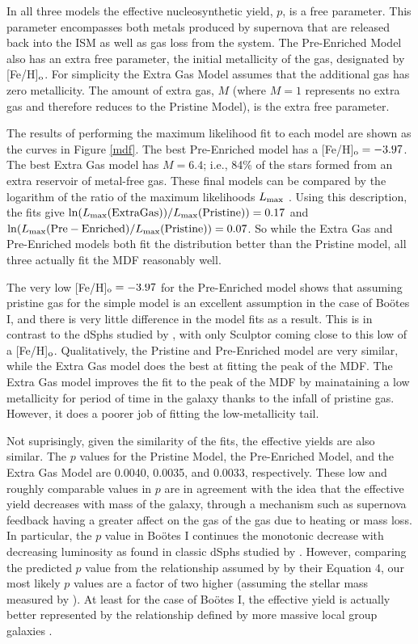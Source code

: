 \documentclass[iop]{emulateapj}
\def\bootes{Bo\"{o}tes I}
\begin{document}
In all three models the effective nucleosynthetic yield, $p$, is a
free parameter. This parameter encompasses both metals produced by
supernova that are released back into the ISM as well as gas loss from the
system. The Pre-Enriched Model also has an extra free parameter, the
initial metallicity of the gas, designated by [Fe/H]$_{\rm o}$. For
simplicity the Extra Gas Model assumes that the additional gas has
zero metallicity. The amount of extra gas, $M$ (where $M=1$ represents
no extra gas and therefore reduces to the Pristine Model), is the
extra free parameter.

The results of performing the maximum likelihood fit to each model are
shown as the curves in Figure \ref{mdf}. The best Pre-Enriched model
has a [Fe/H]$_{\rm o}=-3.97$. The best Extra Gas model has $M=6.4$;
i.e., 84\% of the stars formed from an extra reservoir of metal-free
gas. These final models can be compared by the logarithm of the ratio
of the maximum likelihoods $L_{\rm max}$ \citep{kirby11a}. Using this
description, the fits give ${\rm ln} (L_{\rm max}({\rm{Extra
    Gas)})}/L_{\rm max}({\rm Pristine}))=0.17$ and ${\rm ln} (L_{\rm
  max}({\rm{Pre-Enriched}) }/L_{\rm max}({\rm Pristine}))=0.07$. So
while the Extra Gas and Pre-Enriched models both fit the distribution
better than the Pristine model, all three actually fit the MDF
reasonably well. 

The very low [Fe/H]$_{\rm o}=-3.97$ for the
Pre-Enriched model shows that assuming pristine gas for the simple
model is an excellent assumption in the case of \bootes{}, and there
is very little difference in the model fits as a result. This is in
contrast to the dSphs studied by \citet{kirby11a}, with only Sculptor
coming close to this low of a [Fe/H]$_{\rm o}$. Qualitatively, the
Pristine and Pre-Enriched model are very similar, while the Extra Gas
model does the best at fitting the peak of the MDF. The Extra Gas
model improves the fit to the peak of the MDF by mainataining a low
metallicity for period of time in the galaxy thanks to the infall of
pristine gas. However, it does a poorer job of fitting the
low-metallicity tail.

Not suprisingly, given the similarity of the fits, the effective
yields are also similar. The $p$ values for the Pristine Model, the
Pre-Enriched Model, and the Extra Gas Model are 0.0040, 0.0035, and
0.0033, respectively. These low and roughly comparable values in $p$
are in agreement with the idea that the effective yield decreases with
mass of the galaxy, through a mechanism such as supernova feedback
having a greater affect on the gas of the gas due to heating or mass
loss. In particular, the $p$ value in \bootes{} continues the monotonic decrease
with decreasing luminosity as found in classic dSphs studied by
\citet{kirby11a}. However, comparing the predicted $p$ value from the
relationship assumed by \citet{prantzos08} by their Equation 4, our
most likely $p$ values are a factor of two higher (assuming the
stellar mass measured by \citealt{martin08}). At least for the case of
\bootes{}, the effective yield is actually better represented by the
relationship defined by more massive local group galaxies
\citep{dw03}.
\end{document}
